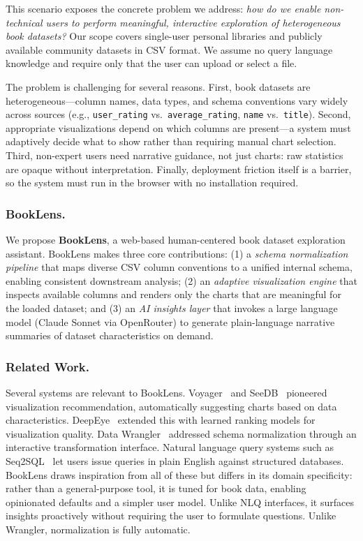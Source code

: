 \documentclass[sigconf]{acmart}
\begin{document}
This scenario exposes the concrete problem we address: \textit{how do we enable non-technical users to perform meaningful, interactive exploration of heterogeneous book datasets?} Our scope covers single-user personal libraries and publicly available community datasets in CSV format. We assume no query language knowledge and require only that the user can upload or select a file.

The problem is challenging for several reasons. First, book datasets are heterogeneous---column names, data types, and schema conventions vary widely across sources (e.g., \texttt{user\_rating} vs.\ \texttt{average\_rating}, \texttt{name} vs.\ \texttt{title}). Second, appropriate visualizations depend on which columns are present---a system must adaptively decide what to show rather than requiring manual chart selection. Third, non-expert users need narrative guidance, not just charts: raw statistics are opaque without interpretation. Finally, deployment friction itself is a barrier, so the system must run in the browser with no installation required.

\subsubsection*{BookLens.} We propose \textbf{BookLens}, a web-based human-centered book dataset exploration assistant. BookLens makes three core contributions: (1) a \textit{schema normalization pipeline} that maps diverse CSV column conventions to a unified internal schema, enabling consistent downstream analysis; (2) an \textit{adaptive visualization engine} that inspects available columns and renders only the charts that are meaningful for the loaded dataset; and (3) an \textit{AI insights layer} that invokes a large language model (Claude Sonnet via OpenRouter) to generate plain-language narrative summaries of dataset characteristics on demand.

\subsubsection*{Related Work.} Several systems are relevant to BookLens. Voyager~\cite{voyager} and SeeDB~\cite{seedb} pioneered visualization recommendation, automatically suggesting charts based on data characteristics. DeepEye~\cite{deepeye} extended this with learned ranking models for visualization quality. Data Wrangler~\cite{wrangler} addressed schema normalization through an interactive transformation interface. Natural language query systems such as Seq2SQL~\cite{seq2sql} let users issue queries in plain English against structured databases. BookLens draws inspiration from all of these but differs in its domain specificity: rather than a general-purpose tool, it is tuned for book data, enabling opinionated defaults and a simpler user model. Unlike NLQ interfaces, it surfaces insights proactively without requiring the user to formulate questions. Unlike Wrangler, normalization is fully automatic.
\end{document}
